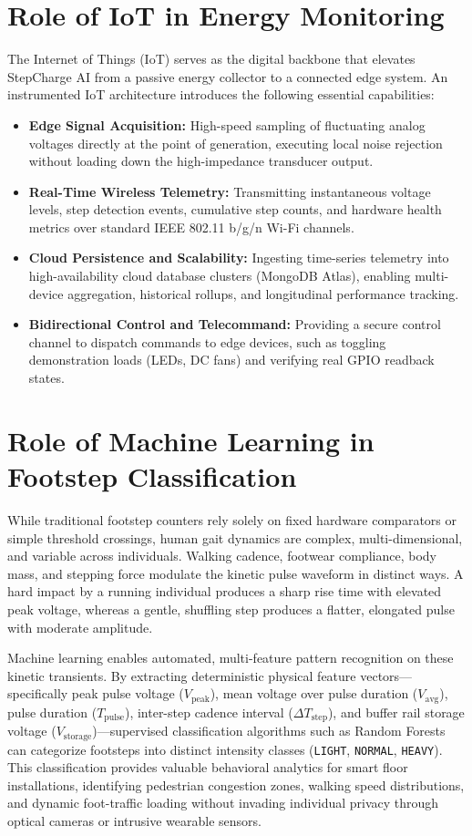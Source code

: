 \section{Role of IoT in Energy Monitoring}
The Internet of Things (IoT) serves as the digital backbone that elevates StepCharge AI from a passive energy collector to a connected edge system. An instrumented IoT architecture introduces the following essential capabilities:
\begin{itemize}
    \item \textbf{Edge Signal Acquisition:} High-speed sampling of fluctuating analog voltages directly at the point of generation, executing local noise rejection without loading down the high-impedance transducer output.
    \item \textbf{Real-Time Wireless Telemetry:} Transmitting instantaneous voltage levels, step detection events, cumulative step counts, and hardware health metrics over standard IEEE 802.11 b/g/n Wi-Fi channels.
    \item \textbf{Cloud Persistence and Scalability:} Ingesting time-series telemetry into high-availability cloud database clusters (MongoDB Atlas), enabling multi-device aggregation, historical rollups, and longitudinal performance tracking.
    \item \textbf{Bidirectional Control and Telecommand:} Providing a secure control channel to dispatch commands to edge devices, such as toggling demonstration loads (LEDs, DC fans) and verifying real GPIO readback states.
\end{itemize}

\section{Role of Machine Learning in Footstep Classification}
While traditional footstep counters rely solely on fixed hardware comparators or simple threshold crossings, human gait dynamics are complex, multi-dimensional, and variable across individuals. Walking cadence, footwear compliance, body mass, and stepping force modulate the kinetic pulse waveform in distinct ways. A hard impact by a running individual produces a sharp rise time with elevated peak voltage, whereas a gentle, shuffling step produces a flatter, elongated pulse with moderate amplitude.

Machine learning enables automated, multi-feature pattern recognition on these kinetic transients. By extracting deterministic physical feature vectors---specifically peak pulse voltage ($V_{\text{peak}}$), mean voltage over pulse duration ($V_{\text{avg}}$), pulse duration ($T_{\text{pulse}}$), inter-step cadence interval ($\Delta T_{\text{step}}$), and buffer rail storage voltage ($V_{\text{storage}}$)---supervised classification algorithms such as Random Forests can categorize footsteps into distinct intensity classes (\texttt{LIGHT}, \texttt{NORMAL}, \texttt{HEAVY}). This classification provides valuable behavioral analytics for smart floor installations, identifying pedestrian congestion zones, walking speed distributions, and dynamic foot-traffic loading without invading individual privacy through optical cameras or intrusive wearable sensors.

